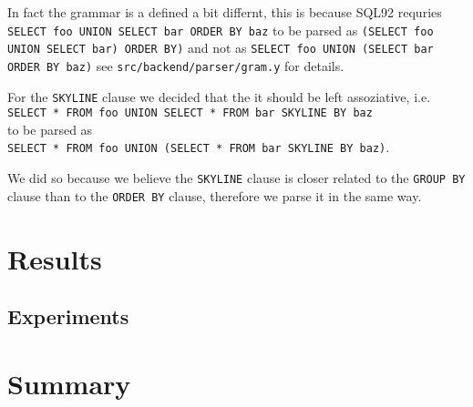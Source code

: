\newcommand\inlinesql[1]{{\tt #1}}
\newcommand\sql[1]{\inlinesql{#1}}
\newcommand\srcref[1]{{\tt #1}}

In fact the grammar is a defined a bit differnt, this is because SQL92
 requries
\sql{SELECT foo UNION SELECT bar ORDER BY baz}
to be parsed as 
\sql{(SELECT foo UNION SELECT bar) ORDER BY)}
and not as
\sql{SELECT foo UNION (SELECT bar ORDER BY baz)}
see \srcref{src/backend/parser/gram.y} for details.

For the \inlinesql{SKYLINE} clause we decided that the it should be left
assoziative, i.e. \\
\sql{SELECT * FROM foo UNION SELECT * FROM bar SKYLINE BY baz} \\
to be parsed as \\
\sql{SELECT * FROM foo UNION (SELECT * FROM bar SKYLINE BY baz)}. 

We did so because we believe the \inlinesql{SKYLINE} clause is closer
related to the \inlinesql{GROUP BY} clause than to the \inlinesql{ORDER BY}
clause, therefore we parse it in the same way.

\chapter{Results\revision}
\label{chap:Results}

\section{Experiments}

\chapter*{Summary\revision}



